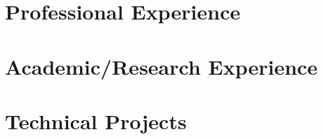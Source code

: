\documentclass{resume}
\begin{document}

\section{Professional Experience}



\section{Academic/Research Experience}



\section{Technical Projects}


\end{document}
